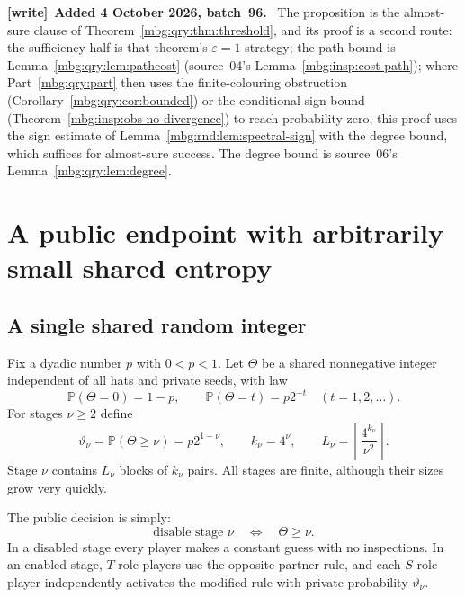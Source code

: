 \documentclass[11pt,letterpaper]{article}
\theoremstyle{definition}
\newcommand{\Prb}{\mathbb P}
\newenvironment{writenote}[1][]{\par\smallskip\begingroup\small
 \noindent\textbf{[write]}\if\relax\detokenize{#1}\relax\else~\textbf{#1.}\fi\ }%
 {\par\endgroup\smallskip}
\begin{document}
\begin{writenote}[Added 4 October 2026, batch~96]
The proposition is the almost-sure clause of Theorem~\ref{mbg:qry:thm:threshold}, and its proof is a second route: the sufficiency half is that theorem's $\varepsilon=1$ strategy; the path bound is Lemma~\ref{mbg:qry:lem:pathcost} (source~04's Lemma~\ref{mbg:insp:cost-path}); where Part~\ref{mbg:qry:part} then uses the finite-colouring obstruction (Corollary~\ref{mbg:qry:cor:bounded}) or the conditional sign bound (Theorem~\ref{mbg:insp:obs-no-divergence}) to reach probability zero, this proof uses the sign estimate of Lemma~\ref{mbg:rnd:lem:spectral-sign} with the degree bound, which suffices for almost-sure success. The degree bound is source~06's Lemma~\ref{mbg:qry:lem:degree}.
\end{writenote}

\section{A public endpoint with arbitrarily small shared entropy}
\label{mbg:rnd:sec:public}

\subsection{A single shared random integer}

Fix a dyadic number $p$ with $0<p<1$. Let $\Theta$ be a shared nonnegative
integer independent of all hats and private seeds, with law
\begin{equation}
 \Prb(\Theta=0)=1-p,\qquad
 \Prb(\Theta=t)=p2^{-t}\quad(t=1,2,\ldots).
 \label{mbg:rnd:eq:public-law}
\end{equation}
For stages $\nu\ge2$ define
\begin{equation}
 \vartheta_\nu=\Prb(\Theta\ge \nu)=p2^{1-\nu},\qquad
 k_\nu=4^\nu,\qquad
 L_\nu=\left\lceil\frac{4^{k_\nu}}{\nu^2}\right\rceil.
 \label{mbg:rnd:eq:public-schedule}
\end{equation}
Stage $\nu$ contains $L_\nu$ blocks of $k_\nu$ pairs. All stages are finite,
although their sizes grow very quickly.

The public decision is simply:
\begin{equation}
 \text{disable stage }\nu\quad\Longleftrightarrow\quad \Theta\ge \nu.
 \label{mbg:rnd:eq:disable}
\end{equation}
In a disabled stage every player makes a constant guess with no
inspections. In an enabled stage, $T$-role players use the opposite
partner rule, and each $S$-role player independently activates the
modified rule with private probability $\vartheta_\nu$.
\end{document}
